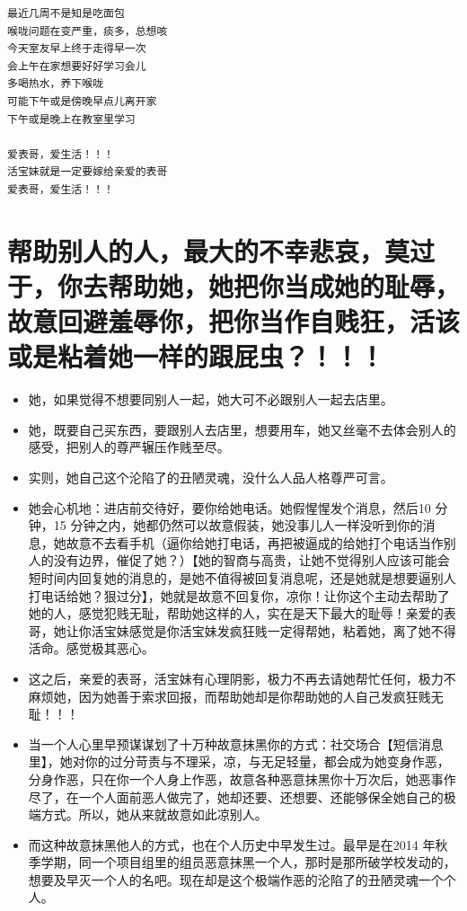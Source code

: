 \documentclass[9pt, b5paper]{article}
\begin{document}
\begin{enumerate}
\begin{verbatim}
最近几周不是知是吃面包
喉咙问题在变严重，痰多，总想咳
今天室友早上终于走得早一次
会上午在家想要好好学习会儿
多喝热水，养下喉咙
可能下午或是傍晚早点儿离开家
下午或是晚上在教室里学习

爱表哥，爱生活！！！
活宝妹就是一定要嫁给亲爱的表哥
爱表哥，爱生活！！！
\end{verbatim}
\end{enumerate}

\section{帮助别人的人，最大的不幸悲哀，莫过于，你去帮助她，她把你当成她的耻辱，故意回避羞辱你，把你当作自贱狂，活该或是粘着她一样的跟屁虫？！！！}
\label{sec-5}
\begin{itemize}
\item 她，如果觉得不想要同别人一起，她大可不必跟别人一起去店里。
\item 她，既要自己买东西，要跟别人去店里，想要用车，她又丝毫不去体会别人的感受，把别人的尊严辗压作贱至尽。
\item 实则，她自己这个沦陷了的丑陋灵魂，没什么人品人格尊严可言。
\item 她会心机地：进店前交待好，要你给她电话。她假惺惺发个消息，然后10 分钟，15 分钟之内，她都仍然可以故意假装，她没事儿人一样没听到你的消息，她故意不去看手机（逼你给她打电话，再把被逼成的给她打个电话当作别人的没有边界，催促了她？）【她的智商与高贵，让她不觉得别人应该可能会短时间内回复她的消息的，是她不值得被回复消息呢，还是她就是想要逼别人打电话给她？狠过分】，她就是故意不回复你，凉你！让你这个主动去帮助了她的人，感觉犯贱无耻，帮助她这样的人，实在是天下最大的耻辱！亲爱的表哥，她让你活宝妹感觉是你活宝妹发疯狂贱一定得帮她，粘着她，离了她不得活命。感觉极其恶心。
\item 这之后，亲爱的表哥，活宝妹有心理阴影，极力不再去请她帮忙任何，极力不麻烦她，因为她善于索求回报，而帮助她却是你帮助她的人自己发疯狂贱无耻！！！

\item 当一个人心里早预谋谋划了十万种故意抹黑你的方式：社交场合【短信消息里】，她对你的过分苛责与不理采，凉，与无足轻量，都会成为她变身作恶，分身作恶，只在你一个人身上作恶，故意各种恶意抹黑你十万次后，她恶事作尽了，在一个人面前恶人做完了，她却还要、还想要、还能够保全她自己的极端方式。所以，她从来就故意如此凉别人。
\item 而这种故意抹黑他人的方式，也在个人历史中早发生过。最早是在2014 年秋季学期，同一个项目组里的组员恶意抹黑一个人，那时是那所破学校发动的，想要及早灭一个人的名吧。现在却是这个极端作恶的沦陷了的丑陋灵魂一个个人。


\end{itemize}
\end{document}
